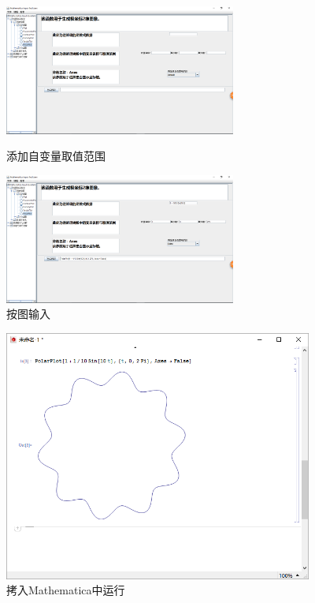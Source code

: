 \documentclass[hyperref, UTF8
,bookmarksnumbered=true, oneside]{ctexbook}
\begin{document}
\begin{itemize}
            	\begin{figure}[!h]
	                \begin{minipage}[b]{0.45\textwidth}
	                \centering
	                \includegraphics[width=3in]{14.png}
	                \caption{添加自变量取值范围}
	                \label{pic:MathPack}
	                \end{minipage}%
	                \hspace{0.1\textwidth}%
	                \begin{minipage}[b]{0.45\textwidth}
	                \centering
	                \includegraphics[width=3in]{15.png}
	                \caption{按图输入}
	                \label{pic:GUIPack}
	                \end{minipage}
            	\end{figure}

            	\begin{figure}[!h]
                	\centering
                	\includegraphics[width=4in]{16.png}
                	\caption{拷入Mathematica中运行}    
                	\label{pic:MathObject}
            	\end{figure}

		\end{itemize}
\end{document}
